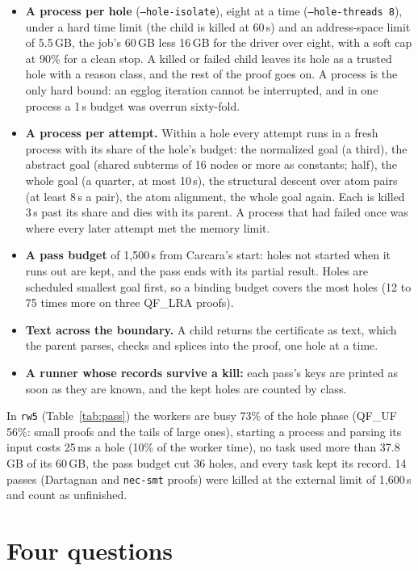 \documentclass[11pt,a4paper]{article}
\newcommand{\UF}{QF\_UF}
\newcommand{\LRA}{QF\_LRA}
\newcommand{\code}[1]{\texttt{#1}}
\begin{document}
\begin{itemize}
  \item \textbf{A process per hole} (\code{--hole-isolate}), eight at a
    time (\code{--hole-threads 8}), under a hard time limit (the child is
    killed at 60\,s) and an address-space limit of 5.5\,GB, the job's 60\,GB
    less 16\,GB for the driver over eight, with a soft cap at 90\% for a
    clean stop. A killed or failed child leaves its hole as a trusted hole
    with a reason class, and the rest of the proof goes on. A process is
    the only hard bound: an egglog iteration cannot be interrupted, and in
    one process a 1\,s budget was overrun sixty-fold.
  \item \textbf{A process per attempt.} Within a hole every attempt runs in
    a fresh process with its share of the hole's budget: the normalized
    goal (a third), the abstract goal (shared subterms of 16 nodes or more
    as constants; half), the whole goal (a quarter, at most 10\,s), the
    structural descent over atom pairs (at least 8\,s a pair), the atom
    alignment, the whole goal again. Each is killed 3\,s past its share and
    dies with its parent. A process that had failed once was where every
    later attempt met the memory limit.
  \item \textbf{A pass budget} of 1,500\,s from Carcara's start: holes not
    started when it runs out are kept, and the pass ends with its partial
    result. Holes are scheduled smallest goal first, so a binding budget
    covers the most holes (12 to 75 times more on three \LRA{} proofs).
  \item \textbf{Text across the boundary.} A child returns the certificate
    as text, which the parent parses, checks and splices into the proof,
    one hole at a time.
  \item \textbf{A runner whose records survive a kill:} each pass's keys are
    printed as soon as they are known, and the kept holes are counted by
    class.
\end{itemize}
In \code{rw5} (Table~\ref{tab:pass}) the workers are busy 73\% of the hole
phase (\UF{} 56\%: small proofs and the tails of large ones), starting a
process and parsing its input costs 25\,ms a hole (10\% of the worker time),
no task used more than 37.8\,GB of its 60\,GB, the pass budget cut 36
holes, and every task kept its record. 14 passes (Dartagnan and
\code{nec-smt} proofs) were killed at the external limit of 1,600\,s and
count as unfinished.

\section{Four questions}\label{sec:questions}
\end{document}
